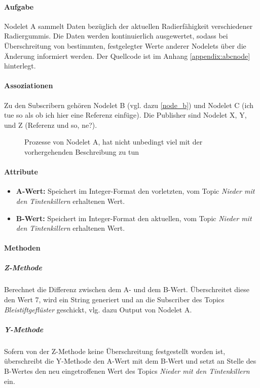 \documentclass[a4paper, 12pt, titlepage]{scrartcl}
\begin{document}
				\paragraph{Aufgabe} Nodelet A sammelt Daten bezüglich der aktuellen Radierfähigkeit verschiedener Radiergummis. Die Daten werden kontinuierlich ausgewertet, sodass bei Überschreitung von bestimmten, festgelegter Werte anderer Nodelets über die Änderung informiert werden. Der Quellcode ist im Anhang \ref{appendix:abcnode} hinterlegt. 
				
				\paragraph{Assoziationen} Zu den Subscribern gehören Nodelet B (vgl. dazu \ref{node_b}) und Nodelet C (ich tue so als ob ich hier eine Referenz einfüge). Die Publisher sind Nodelet X, Y, und Z (Referenz und so, ne?).
				\begin{figure}[h!]
					\centering
					\caption{Prozesse von Nodelet A, hat nicht unbedingt viel mit der vorhergehenden Beschreibung zu tun}
					\label{fig:node_a}
				\end{figure}
				
				\paragraph{Attribute} %
				\begin{itemize}
					\item \textbf{A-Wert:} Speichert im Integer-Format den vorletzten, vom Topic \emph{Nieder mit den Tintenkillern} erhaltenen Wert.
					\item \textbf{B-Wert:} Speichert im Integer-Format den aktuellen, vom Topic \emph{Nieder mit den Tintenkillern} erhaltenen Wert.
				\end{itemize} 
				
				\paragraph{Methoden}
				
					\subparagraph{Z-Methode} Berechnet die Differenz zwischen dem A- und dem B-Wert. Überschreitet diese den Wert 7, wird ein String generiert und an die Subscriber des Topics \emph{Bleistiftgeflüster} geschickt, vlg. dazu Output von Nodelet A.
					\subparagraph{Y-Methode} Sofern von der Z-Methode keine Überschreitung festgestellt worden ist, überschreibt die Y-Methode den A-Wert mit dem B-Wert und setzt an Stelle des B-Wertes den neu eingetroffenen Wert des Topics \emph{Nieder mit den Tintenkillern} ein. 
				
\end{document}
